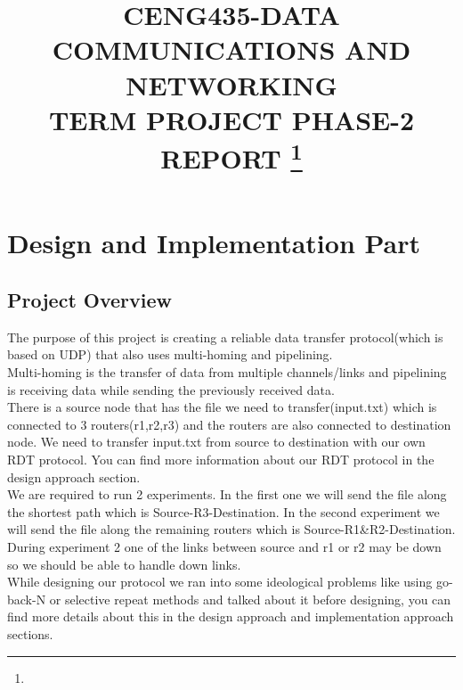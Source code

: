 \documentclass[conference]{IEEEtran}
\begin{document}
\title{CENG435-DATA COMMUNICATIONS AND NETWORKING \\ TERM PROJECT PHASE-2 REPORT
{\footnotesize}
\thanks{}
}

\author{
\and
{}
}

\maketitle

\section{Design and Implementation Part}
\subsection{Project Overview}
The purpose of this project is creating a reliable data transfer protocol(which is based on UDP) that also uses multi-homing and pipelining. \\
Multi-homing is the transfer of data from multiple channels/links and pipelining is receiving data while sending the previously received data. \\
There is a source node that has the file we need to transfer(input.txt) which is connected to 3 routers(r1,r2,r3) and the routers are also connected to destination node. We need to transfer input.txt from source to destination with our own RDT protocol. You can find more information about our RDT protocol in the design approach section. \\
We are required to run 2 experiments. In the first one we will send the file along the shortest path which is Source-R3-Destination. In the second experiment we will send the file along the remaining routers which is Source-R1\&R2-Destination. During experiment 2 one of the links between source and r1 or r2 may be down so we should be able to handle down links. \\
While designing our protocol we ran into some ideological problems like using go-back-N or selective repeat methods and talked about it before designing, you can find more details about this in the design approach and implementation approach sections.
\end{document}
